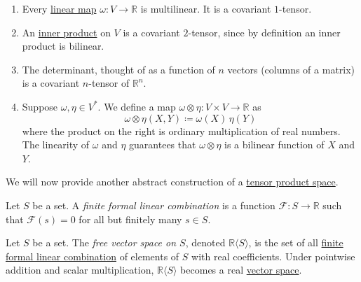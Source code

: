 \documentclass{article}
\newcounter{definition}[section]
\newcounter{example}[section]
\begin{document}
    \begin{example}
      \label{ex:covariant-tensors}
    \begin{enumerate}
        \item Every \hyperref[lin-def:linear_map]{linear map} $\omega: V \to \mathbb{R}$ is multilinear. It is a covariant $1$-tensor. 
        \item An \hyperref[lin-def:inner-product]{inner product} on $V$ is a covariant $2$-tensor, since by definition an inner product is bilinear.  
        \item The determinant, thought of as a function of $n$ vectors (columns of a matrix) is a covariant $n$-tensor of $\mathbb{R}^n$. 
        \item Suppose $\omega, \eta \in V^*$. We define a map $\omega \otimes \eta: V \times V \to \mathbb{R}$ as
        \begin{equation}
          \omega \otimes \eta (X, Y) \coloneqq \omega (X) \, \eta(Y)
        \end{equation}
        where the product on the right is ordinary multiplication of real numbers. The linearity of $\omega$ and $\eta$ guarantees that $\omega \otimes \eta$ is a bilinear function of $X$ and $Y$. 
    \end{enumerate}
    \end{example}

    We will now provide another abstract construction of a \hyperref[lin-def:tensor]{tensor product space}. 

    \begin{definition}
      \label{def:finite-formal-linear-combination}
    Let $S$ be a set. A \textit{finite formal linear combination} is a function $\mathcal{F}: S\to \mathbb{R}$ such that $\mathcal{F}(s) = 0$ for all but finitely many $s \in S$. 
    \end{definition}

    \begin{definition}
      \label{def:free-vector-space-on-s}
    Let $S$ be a set. The \textit{free vector space on $S$}, denoted $\mathbb{R} \langle S \rangle$, is the set of all \hyperref[def:finite-formal-linear-combination]{finite formal linear combination} of elements of $S$ with real coefficients. Under pointwise addition and scalar multiplication, $\mathbb{R} \langle S \rangle$ becomes a real \hyperref[lin-def:vector-space]{vector space}. 
    \end{definition}
\end{document}
